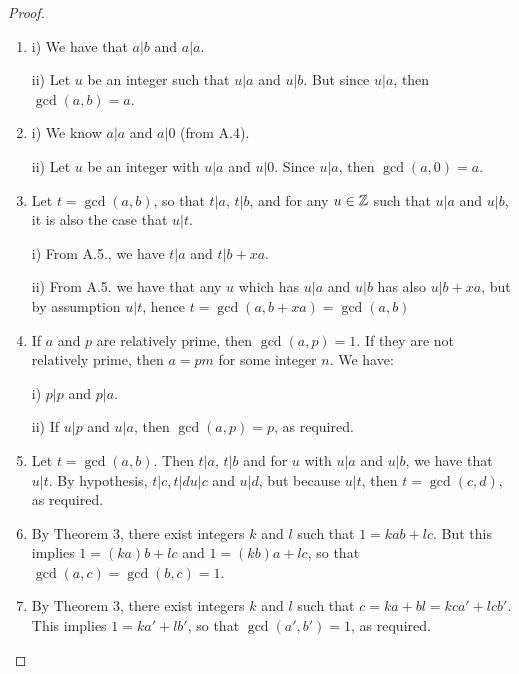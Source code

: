 \begin{proof}
 \begin{enumerate}
    \item i) We have that $a\vert b$ and $a\vert a$.

    ii) Let $u$ be an integer such that $u\vert a$ and $u\vert b$. But since $u\vert a$, then $\gcd(a,b)=a$.
    \item i) We know $a\vert a$ and $a\vert 0$ (from A.4).

    ii) Let $u$ be an integer with $u\vert a$ and $u\vert 0$. Since $u\vert a$, then $\gcd(a,0)=a$.
    \item Let $t=\gcd(a,b)$, so that $t\vert a$, $t\vert b$, and for any $u\in\mathbb{Z}$ such that $u\vert a$ and $u\vert b$, it is also the case that $u\vert t$.

    i) From A.5., we have $t\vert a$ and $t\vert b+xa$.

    ii) From A.5. we have that any $u$ which has $u\vert a$ and $u\vert b$ has also $u\vert b+xa$, but by assumption $u\vert t$, hence $t=\gcd(a,b+xa)=\gcd(a,b)$
    \item If $a$ and $p$ are relatively prime, then $\gcd(a,p)=1$. If they are not relatively prime, then $a=pm$ for some integer $n$. We have:

    i) $p\vert p$ and $p\vert a$.

    ii) If $u\vert p$ and $u\vert a$, then $\gcd(a,p)=p$, as required.
    \item Let $t=\gcd(a,b)$. Then $t\vert a$, $t\vert b$ and for $u$ with $u\vert a$ and $u\vert b$, we have that $u\vert t$. By hypothesis, $t\vert c, t\vert d u\vert c$ and $u\vert d$, but because $u\vert t$, then $t=\gcd(c,d)$, as required.
    \item By Theorem 3, there exist integers $k$ and $l$ such that $1=kab+lc$. But this implies $1=(ka)b+lc$ and $1=(kb)a+lc$, so that $\gcd(a,c)=\gcd(b,c)=1$.
    \item By Theorem 3, there exist integers $k$ and $l$ such that $c=ka+bl=kca'+lcb'$. This implies $1=ka'+lb'$, so that $\gcd(a',b')=1$, as required.
\end{enumerate}
\end{proof}


